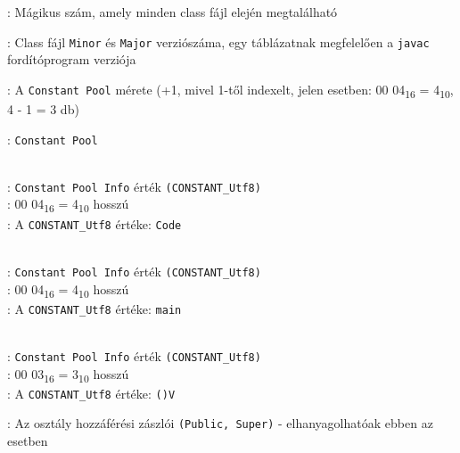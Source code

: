 \begin{compactitem}
\setlength\itemsep{-5px}
\item {}: Mágikus szám, amely minden class fájl elején megtalálható
\item {} : Class fájl \lstinline{Minor} és \lstinline{Major} verziószáma, egy táblázatnak megfelelően a \lstinline{javac} fordítóprogram verziója
\item {}: A \lstinline{Constant Pool} mérete (+1, mivel 1-től indexelt, jelen esetben: 00 04\textsubscript{16} = 4\textsubscript{10}, 4 - 1 = 3 db)
\item {}: \lstinline{Constant Pool}
\begin{compactitem}
    \setlength\itemsep{-5px}
    \item {}   \\
    : \lstinline{Constant Pool Info} érték \lstinline{(CONSTANT_Utf8)} \\
    : 00 04\textsubscript{16} = 4\textsubscript{10} hosszú \\
    : A \lstinline{CONSTANT_Utf8} értéke: \lstinline{Code}
    \item {}   \\
    : \lstinline{Constant Pool Info} érték \lstinline{(CONSTANT_Utf8)} \\
    : 00 04\textsubscript{16} = 4\textsubscript{10} hosszú \\
    : A \lstinline{CONSTANT_Utf8} értéke: \lstinline{main}
    \item {}   \\
    : \lstinline{Constant Pool Info} érték \lstinline{(CONSTANT_Utf8)} \\
    : 00 03\textsubscript{16} = 3\textsubscript{10} hosszú \\
    : A \lstinline{CONSTANT_Utf8} értéke: \lstinline{()V}
\end{compactitem}
\item {}: Az osztály hozzáférési zászlói \lstinline{(Public, Super)} - elhanyagolhatóak ebben az esetben

\end{compactitem}
